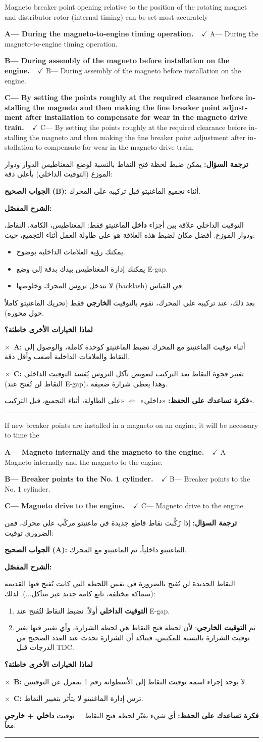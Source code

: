 \documentclass[11pt,a4paper]{article}
\newcommand{\en}[1]{\textenglish{#1}}
\newcommand{\correctletter}{}
\newcommand{\opt}[2]{%
  \ifdefstring{\correctletter}{#1}%
    {\textcolor{ansgreen}{\textbf{#1— #2\ \ $\checkmark$}}}%
    {#1— #2}\par}
\newcommand{\Q}[6]{%
  \renewcommand{\correctletter}{#6}%
  \par\bigskip
  \phantomsection\label{q#1}%
  \begin{tcolorbox}[enhanced,breakable,colback=qback,colframe=qframe,
      arc=2mm,boxrule=0.8pt,fonttitle=\bfseries,
      title={\en{Question #1}}]
    \begin{english}
      #2\par\smallskip
      \opt{A}{#3}\opt{B}{#4}\opt{C}{#5}
    \end{english}
  \end{tcolorbox}}
\newcommand{\tr}[1]{\textbf{\textcolor{qframe}{ترجمة السؤال:}} #1\par}
\newcommand{\ans}[2]{%
  \begin{tcolorbox}[colback=ansback,colframe=ansgreen,boxrule=0.6pt,arc=1.5mm,
      left=4pt,right=4pt,top=2pt,bottom=2pt]
    \textbf{\textcolor{ansgreen}{الجواب الصحيح (\en{#1}):}} #2
  \end{tcolorbox}}
\newcommand{\sharh}[1]{\textbf{\textcolor{conceptc}{الشرح المفصّل:}}\par #1\par}
\newcommand{\nohead}{\textbf{\textcolor{wrongc}{لماذا الخيارات الأخرى خاطئة؟}}\par}
\newcommand{\no}[2]{\hspace*{1em}\textcolor{wrongc}{$\times$}\ \textbf{\en{#1}:} #2\par}
\newcommand{\tip}[1]{%
  \begin{tcolorbox}[colback=tipback,colframe=tipframe,boxrule=0.5pt,arc=1.5mm,
      left=4pt,right=4pt,top=2pt,bottom=2pt]
    \textbf{فكرة تساعدك على الحفظ:} #1
  \end{tcolorbox}}
\newcommand{\qsep}{\par\medskip\noindent\textcolor{qframe!40}{\rule{\linewidth}{0.4pt}}\par}
\begin{document}
\Q{8507}{Magneto breaker point opening relative to the position of the rotating magnet and distributor rotor (internal timing) can be set most accurately}
{During the magneto-to-engine timing operation.}
{During assembly of the magneto before installation on the engine.}
{By setting the points roughly at the required clearance before installing the magneto and then making the fine breaker point adjustment after installation to compensate for wear in the magneto drive train.}{B}
\tr{يمكن ضبط لحظة فتح النقاط بالنسبة لوضع المغناطيس الدوار ودوار الموزع (التوقيت الداخلي) بأعلى دقة:}
\ans{B}{أثناء تجميع الماغنيتو قبل تركيبه على المحرك.}
\sharh{التوقيت الداخلي علاقة بين أجزاء \textbf{داخل} الماغنيتو فقط: المغناطيس، الكامة، النقاط، ودوار الموزع. أفضل مكان لضبط هذه العلاقة هو على طاولة العمل أثناء التجميع، حيث:
\begin{itemize}
  \item يمكنك رؤية العلامات الداخلية بوضوح.
  \item يمكنك إدارة المغناطيس بيدك بدقة إلى وضع \en{E-gap}.
  \item لا تتدخل تروس المحرك وخلوصها (\en{backlash}) في القياس.
\end{itemize}
بعد ذلك، عند تركيبه على المحرك، نقوم بالتوقيت \textbf{الخارجي} فقط (تحريك الماغنيتو كاملاً حول محوره).}
\nohead
\no{A}{أثناء توقيت الماغنيتو مع المحرك نضبط الماغنيتو كوحدة كاملة، والوصول إلى النقاط والعلامات الداخلية أصعب وأقل دقة.}
\no{C}{تغيير فجوة النقاط بعد التركيب لتعويض تآكل التروس يُفسد التوقيت الداخلي (النقاط لن تُفتح عند \en{E-gap})، وهذا يعطي شرارة ضعيفة.}
\tip{«داخلي» $\Leftarrow$ «على الطاولة، أثناء التجميع، قبل التركيب».}
\qsep

\Q{8591}{If new breaker points are installed in a magneto on an engine, it will be necessary to time the}
{Magneto internally and the magneto to the engine.}
{Breaker points to the No. 1 cylinder.}
{Magneto drive to the engine.}{A}
\tr{إذا رُكِّبت نقاط قاطع جديدة في ماغنيتو مركّب على محرك، فمن الضروري توقيت:}
\ans{A}{الماغنيتو داخلياً، ثم الماغنيتو مع المحرك.}
\sharh{النقاط الجديدة لن تُفتح بالضرورة في نفس اللحظة التي كانت تُفتح فيها القديمة (سماكة مختلفة، تابع كامة جديد غير متآكل...). لذلك:
\begin{enumerate}[label=\arabic*.]
  \item \textbf{التوقيت الداخلي} أولاً: نضبط النقاط لتُفتح عند \en{E-gap}.
  \item ثم \textbf{التوقيت الخارجي}: لأن لحظة فتح النقاط هي لحظة الشرارة، وأي تغيير فيها يغير توقيت الشرارة بالنسبة للمكبس، فنتأكد أن الشرارة تحدث عند العدد الصحيح من الدرجات قبل \en{TDC}.
\end{enumerate}}
\nohead
\no{B}{لا يوجد إجراء اسمه توقيت النقاط إلى الأسطوانة رقم 1 بمعزل عن التوقيتين.}
\no{C}{ترس إدارة الماغنيتو لا يتأثر بتغيير النقاط.}
\tip{أي شيء يغيّر لحظة فتح النقاط = توقيت \textbf{داخلي + خارجي} معاً.}
\qsep
\end{document}
